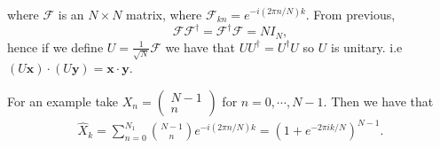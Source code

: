 \documentclass{article}
\begin{document}
where $ \mathcal F $ is an $ N\times N $ matrix, where $ \mathcal F_{kn}=e^{-i(2\pi n/N)k} $. From previous,
\[
  \mathcal F\mathcal F^\dagger = \mathcal F^\dagger \mathcal F =N I_N,
\]
hence if we define $ U=\frac 1{\sqrt N}\mathcal F $ we have that $ U U^\dagger = U^\dagger U $ so $ U $ is unitary. i.e $ (U\mathbf x)\cdot (U\mathbf y)=\mathbf x \cdot \mathbf y $.\par
For an example take $ X_n=\begin{pmatrix}
  N-1 \\ n
\end{pmatrix} $ for $ n=0,\cdots, N-1 $. Then we have that
\begin{align*}
\hat X_k=\sum_{n=0}^{N_1} \binom{N-1}{n} e^{-i(2\pi n/N)k}=\left(1+e^{-2\pi ik/N}\right)^{N-1}.
\end{align*}
\end{document}
